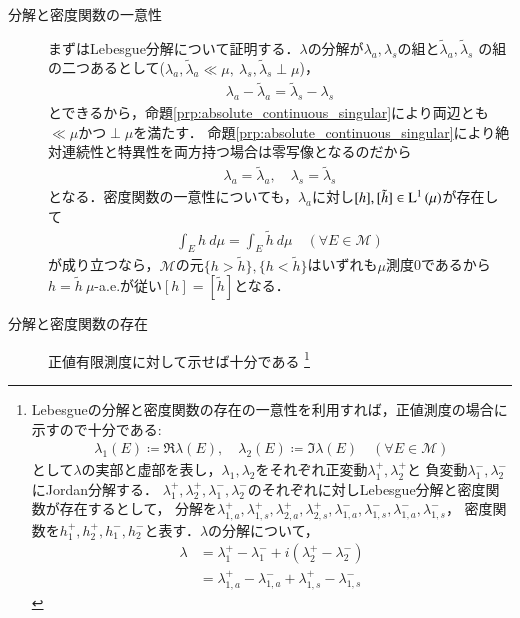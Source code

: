 	\begin{prf}\mbox{}
	\begin{description}
	\item[分解と密度関数の一意性]
		まずはLebesgue分解について証明する．$\lambda$の分解が$\lambda_a,\lambda_s$の組と$\tilde{\lambda}_a,\tilde{\lambda}_s$
		の組の二つあるとして($\lambda_a,\tilde{\lambda}_a \ll \mu,\ \lambda_s,\tilde{\lambda}_s \perp \mu$)，
		\begin{align}
			\lambda_a - \tilde{\lambda}_a = \tilde{\lambda}_s - \lambda_s
		\end{align}
		とできるから，命題\ref{prp:absolute_continuous_singular}により両辺とも$\ll \mu$かつ$\perp \mu$を満たす．
		命題\ref{prp:absolute_continuous_singular}により絶対連続性と特異性を両方持つ場合は零写像となるのだから
		\begin{align}
			\lambda_a = \tilde{\lambda}_a, \quad \lambda_s = \tilde{\lambda}_s
		\end{align}
		となる．密度関数の一意性についても，$\lambda_a$に対し$[h],[\tilde{h}] \in \operatorname{L}^{1} \left(\mu\right)$が存在して
		\begin{align}
			\int_E h\ d\mu = \int_E \tilde{h}\ d\mu \quad (\forall E \in \mathcal{M})
		\end{align}
		が成り立つなら，$\mathcal{M}$の元$\{h > \tilde{h}\},\{h < \tilde{h}\}$はいずれも$\mu$測度0であるから
		$h = \tilde{h}\ \mu$-a.e.が従い$[h] = [\tilde{h}]$となる．
	\item[分解と密度関数の存在]
		正値有限測度に対して示せば十分である
		\footnote{
			Lebesgueの分解と密度関数の存在の一意性を利用すれば，正値測度の場合に示すので十分である:
			\begin{align}
				\lambda_1(E) \coloneqq \Re{\lambda(E)}, \quad \lambda_2(E) \coloneqq \Im{\lambda(E)} \quad (\forall E \in \mathcal{M})
			\end{align}
			として$\lambda$の実部と虚部を表し，$\lambda_1,\lambda_2$をそれぞれ正変動$\lambda_1^+,\lambda_2^+$と
			負変動$\lambda_1^-,\lambda_2^-$にJordan分解する．
			$\lambda_1^+,\lambda_2^+,\lambda_1^-,\lambda_2^-$のそれぞれに対しLebesgue分解と密度関数が存在するとして，
			分解を$\lambda_{1,a}^+,\lambda_{1,s}^+,\lambda_{2,a}^+,\lambda_{2,s}^+,\lambda_{1,a}^-,\lambda_{1,s}^-,\lambda_{1,a}^-,\lambda_{1,s}^-$，
			密度関数を$h_1^+,h_2^+,h_1^-,h_2^-$と表す．$\lambda$の分解について，
			\begin{align}
				\lambda
				&= \lambda_1^+ - \lambda_1^- + i\left( \lambda_2^+ - \lambda_2^- \right) \\
				&= \lambda_{1,a}^+ - \lambda_{1,a}^- + \lambda_{1,s}^+ - \lambda_{1,s}^-

\end{align}}
\end{description}
\end{prf}
